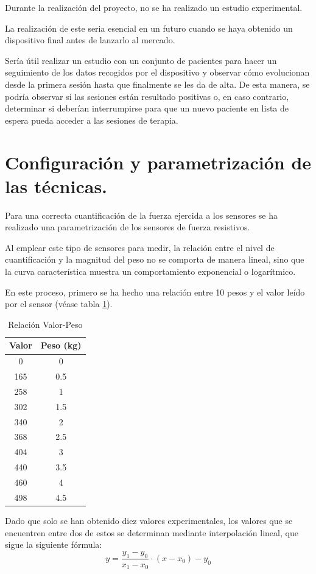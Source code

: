 Durante la realización del proyecto, no se ha realizado un estudio experimental. 

La realización de este seria esencial en un futuro cuando se haya obtenido un dispositivo final antes de lanzarlo al mercado. 

Sería útil realizar un estudio con un conjunto de pacientes para hacer un seguimiento de los datos recogidos por el dispositivo y observar cómo evolucionan desde la primera sesión hasta que finalmente se les da de alta.
De esta manera, se podría observar si las sesiones están resultado positivas o, en caso contrario, determinar si deberían interrumpirse para que un nuevo paciente en lista de espera pueda acceder a las sesiones de terapia.

\section{Configuración y parametrización de las técnicas.}

Para una correcta cuantificación de la fuerza ejercida a los sensores se ha realizado una parametrización de los sensores de fuerza resistivos. 

Al emplear este tipo de sensores para medir, la relación entre el nivel de cuantificación y la magnitud del peso no se comporta de manera lineal, sino que la curva característica muestra un comportamiento exponencial o logarítmico. 

En este proceso, primero se ha hecho una relación entre 10 pesos y el valor leído por el sensor (véase tabla \ref{tab:Relación Valor-Peso}). 
\begin{table}[h]
    \centering
    \begin{tabular}{|c|c|}
    \rowcolor[HTML]{BFBFBF} 
        \hline
        \textbf{Valor} & \textbf{Peso (kg)} \\ \hline
        0   & 0    \\ \hline
        165 & 0.5  \\ \hline
        258 & 1    \\ \hline
        302 & 1.5  \\ \hline
        340 & 2    \\ \hline
        368 & 2.5  \\ \hline
        404 & 3    \\ \hline
        440 & 3.5  \\ \hline
        460 & 4    \\ \hline
        498 & 4.5  \\ \hline
   \end{tabular}
    \caption{Relación Valor-Peso}
    \label{tab:Relación Valor-Peso}
\end{table}
Dado que solo se han obtenido diez valores experimentales, los valores que se encuentren entre dos de estos se determinan mediante interpolación lineal, que sigue la siguiente fórmula:
\begin{equation}
    y = \frac{y_1 - y_0}{x_1 - x_0} \cdot (x - x_0) - y_0
    \label{eq: Interpolación lineal}
\end{equation}

